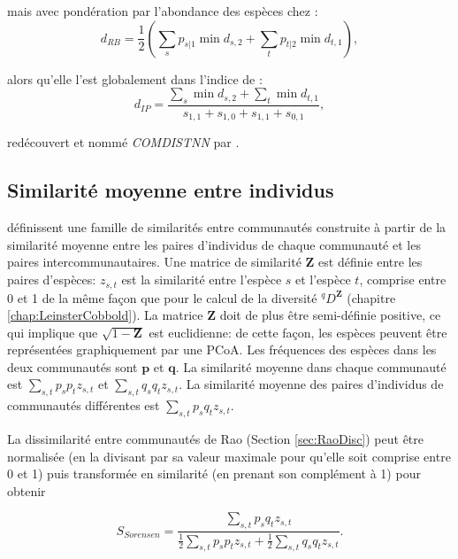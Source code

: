 \documentclass[
  11pt,
  french,
  a4paper,
  extrafontsizes,onecolumn,openright
  ]{memoir}
\begin{document}
mais avec pondération par l'abondance des espèces chez \textcite{Ricotta2008} :
\begin{equation}
  \label{eq:Ricotta2008}
  d_{\mathit{RB}} = \frac{1}{2}\left( \sum_s{p_{s|1}\min{d_{s,2}}} + \sum_t{p_{t|2}\min{d_{t,1}}} \right),
\end{equation}

alors qu'elle l'est globalement dans l'indice de \textcite{Izsak2001} :
\begin{equation}
  \label{eq:Izsak2001}
  d_{\mathit{IP}} = \frac{\sum_s{\min{d_{s,2}}} + \sum_t{\min{d_{t,1}}}}{s_{1,1}+s_{1,0}+s_{1,1}+s_{0,1}},
\end{equation}

redécouvert et nommé \emph{COMDISTNN} par \textcite{Webb2008}.

\hypertarget{similarituxe9-moyenne-entre-individus}{%
\subsection{Similarité moyenne entre individus}\label{similarituxe9-moyenne-entre-individus}}

\textcite{Pavoine2014b} définissent une famille de similarités entre communautés construite à partir de la similarité moyenne entre les paires d'individus de chaque communauté et les paires intercommunautaires.
Une matrice de similarité \(\mathbf{Z}\) est définie entre les paires d'espèces: \(z_{s,t}\) est la similarité entre l'espèce \(s\) et l'espèce \(t\), comprise entre 0 et 1 de la même façon que pour le calcul de la diversité \(^q\!D^{\mathbf{Z}}\) (chapitre \ref{chap:LeinsterCobbold}).
La matrice \(\mathbf{Z}\) doit de plus être semi-définie positive, ce qui implique que \(\sqrt{1-\mathbf{Z}}\) est euclidienne: de cette façon, les espèces peuvent être représentées graphiquement par une PCoA.
Les fréquences des espèces dans les deux communautés sont \(\mathbf{p}\) et \(\mathbf{q}\).
La similarité moyenne dans chaque communauté est \(\sum_{s,t}{p_s p_t z_{s,t}}\) et \(\sum_{s,t}{q_s q_t z_{s,t}}\).
La similarité moyenne des paires d'individus de communautés différentes est \(\sum_{s,t}{p_s q_t z_{s,t}}\).

La dissimilarité entre communautés de Rao (Section \ref{sec:RaoDisc}) peut être normalisée (en la divisant par sa valeur maximale pour qu'elle soit comprise entre 0 et 1) puis transformée en similarité (en prenant son complément à 1) pour obtenir

\begin{equation}
  \label{eq:SorensenAbd}
  S_{\mathit{Sorensen}} = \frac{\sum_{s,t}{p_s q_t z_{s,t}}}{\frac{1}{2}\sum_{s,t}{p_s p_t z_{s,t}} + \frac{1}{2}\sum_{s,t}{q_s q_t z_{s,t}}}.
\end{equation}
\end{document}
